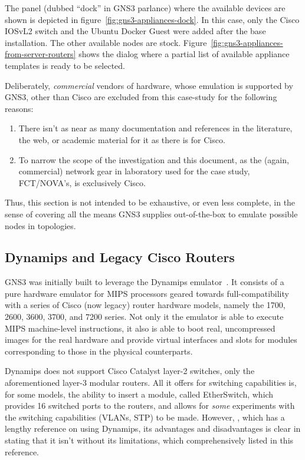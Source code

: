 The panel (dubbed ``dock'' in GNS3 parlance) where the available devices are shown is depicted in figure~\ref{fig:gns3-appliances-dock}.
In this case, only the Cisco IOSvL2 switch and the Ubuntu Docker Guest were added after the base installation.
The other available nodes are stock.
Figure~\ref{fig:gns3-appliances-from-server-routers} shows the dialog where a partial list of available appliance templates is ready to be selected.



Deliberately, \emph{commercial} vendors of hardware, whose emulation is supported by GNS3, other than Cisco are excluded from this case-study for the following reasons:

\begin{enumerate}
  \item There isn't as near as many documentation and references in the literature, the web, or academic material for it as there is for Cisco.
  \item To narrow the scope of the investigation and this document, as the (again, commercial) network gear in laboratory used for the case study, FCT/NOVA's, is exclusively Cisco.
\end{enumerate}

Thus, this section is not intended to be exhaustive, or even less complete, in the sense of covering all the means GNS3 supplies out-of-the-box to emulate possible nodes in topologies.

\subsection{Dynamips and Legacy Cisco Routers}
\label{subsec:gns3dynamipslegacy}

GNS3 was initially built to leverage the Dynamips emulator~\cite{thebookofgns3}.
It consists of a pure hardware emulator for MIPS processors geared towards full-compatibility with a series of Cisco (now legacy) router hardware models, namely the 1700, 2600, 3600, 3700, and 7200 series. %
Not only it the emulator is able to execute MIPS machine-level instructions, it also is able to boot real, uncompressed images for the real hardware and provide virtual interfaces and slots for modules corresponding to those in the physical counterparts.

Dynamips does not support Cisco Catalyst layer-2 switches, only the aforementioned layer-3 modular routers.
All it offers for switching capabilities is, for some models, the ability to insert a module, called EtherSwitch, which provides 16 switched ports to the routers, and allows for \emph{some} experiments with the switching capabilities (VLANs, STP) to be made.
However, \cite{thebookofgns3}, which has a lengthy reference on using Dynamips, its advantages and disadvantages is clear in stating that it isn't without its limitations, which comprehensively listed in this reference.

